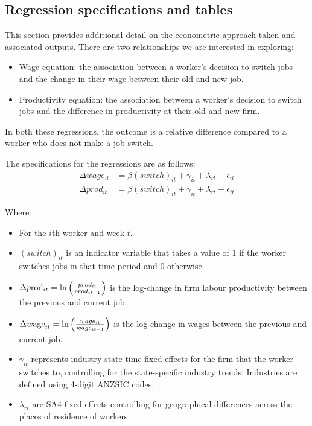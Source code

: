 \documentclass[11pt,twocolumn,openany,leqno]{e61-research-note}
\begin{document}
\begin{appendix}

\chapter{Regression specifications and tables}
\label{app:reg}

This section provides additional detail on the econometric approach taken and associated outputs. There are two relationships we are interested in exploring:
\begin{itemize}
    \item Wage equation: the association between a worker’s decision to switch jobs and the change in their wage between their old and new job.
    \item Productivity equation: the association between a worker’s decision to switch jobs and the difference in productivity at their old and new firm.

\end{itemize}

In both these regressions, the outcome is a relative difference compared to a worker who does not make a job switch.

The specifications for the regressions are as follows:
\begin{align}
    \Delta wage_{it} &= \beta\left(switch\right)_{it}+\gamma_{it}+\lambda_{rt}+\epsilon_{it} \\
    \Delta prod_{it} &= \beta\left(switch\right)_{it}+\gamma_{it}+\lambda_{rt}+\epsilon_{it}
\end{align}

Where:

\begin{itemize}
    \item For the $i$th worker and week $t$.
    \item $\left(switch\right)_{it}$ is an indicator variable that takes a value of 1 if the worker switches jobs in that time period and 0 otherwise.
    \item $\Delta p{\rm rod}_{it}=\ln{\left(\frac{prod_{it}}{prod_{it-1}}\right)}$ is the log-change in firm labour productivity between the previous and current job.
    \item $\Delta w{\rm age}_{it}=\ln{\left(\frac{wage_{it}}{wage_{it-1}}\right)}$ is the log-change in wages between the previous and current job.
    \item $\gamma_{it}$ represents industry-state-time fixed effects for the firm that the worker switches to, controlling for the state-specific industry trends. Industries are defined using 4-digit ANZSIC codes.
    \item $\lambda_{rt}$ are SA4 fixed effects controlling for geographical differences across the places of residence of workers.
\end{itemize}


\end{appendix}
\end{document}
